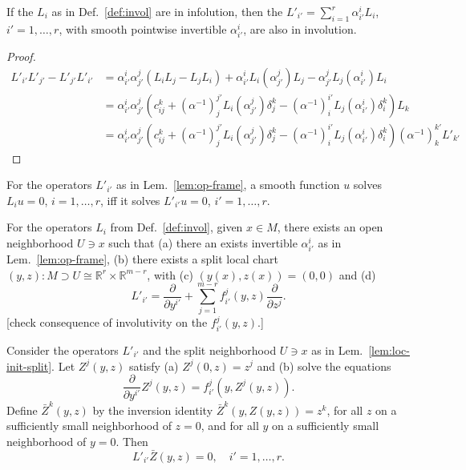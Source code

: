 \begin{lemma} \label{lem:op-frame}
If the $L_i$ as in Def.~\ref{def:invol} are in infolution, then the $L'_{i'} =
\sum_{i=1}^r \alpha_{i'}^i L_i$, $i'=1,\ldots,r$, with smooth pointwise invertible
$\alpha_{i'}^i$, are also in involution.
\end{lemma}
\begin{proof}
\begin{align*}
  L'_{i'} L'_{j'} - L'_{j'} L'_{i'}
  &= \alpha_{i'}^i \alpha_{j'}^j (L_i L_j - L_j L_i)
    + \alpha_{i'}^i L_i(\alpha_{j'}^j) L_j
    - \alpha_{j'}^j L_j(\alpha_{i'}^i) L_i
  \\
  &= \alpha_{i'}^i \alpha_{j'}^j \left(c_{ij}^k
    + (\alpha^{-1})_j^{j'} L_i(\alpha_{j'}^j) \delta_j^k
    - (\alpha^{-1})_i^{i'} L_j(\alpha_{i'}^i) \delta_i^k \right) L_k
  \\
  &= \alpha_{i'}^i \alpha_{j'}^j \left(c_{ij}^k
    + (\alpha^{-1})_j^{j'} L_i(\alpha_{j'}^j) \delta_j^k
    - (\alpha^{-1})_i^{i'} L_j(\alpha_{i'}^i) \delta_i^k \right) (\alpha^{-1})_k^{k'} L'_{k'}
\end{align*}
\end{proof}

\begin{lemma} \label{lem:eq-frame-equiv}
For the operators $L'_{i'}$ as in Lem.~\ref{lem:op-frame}, a smooth function $u$
solves $L_i u = 0$, $i=1,\ldots,r$, iff it solves $L'_{i'} u = 0$,
$i'=1,\ldots,r$.
\end{lemma}

\begin{lemma} \label{lem:loc-init-split}
For the operators $L_i$ from Def.~\ref{def:invol}, given $x \in M$, there exists
an open neighborhood $U\ni x$ such that (a) there an exists invertible
$\alpha_{i'}^i$ as in Lem.~\ref{lem:op-frame}, (b) there exists a split local
chart $(y,z)\colon M \supset U \cong \mathbb{R}^r \times \mathbb{R}^{m-r}$, with
(c) $(y(x),z(x)) = (0,0)$ and (d)
\[
  L'_{i'} = \frac{\partial}{\partial y^{i'}} + \sum_{j=1}^{m-r} f_{i'}^j(y,z) \frac{\partial}{\partial z^j} .
\]
[check consequence of involutivity on the $f_{i'}^j(y,z)$.] \notready
\end{lemma}

\begin{lemma} \label{lem:eq-loc-inv}
Consider the operators $L'_{i'}$ and the split neighborhood $U\ni x$ as in
Lem.~\ref{lem:loc-init-split}. Let $Z^j(y,z)$ satisfy (a) $Z^j(0,z) = z^j$ and
(b) solve the equations
\[
  \frac{\partial}{\partial y^{i'}} Z^j(y,z) = f_{i'}^j(y, Z^j(y,z)) .
\]
Define $\bar{Z}^k(y,z)$ by the inversion identity $\bar{Z}^k(y, Z(y, z)) = z^k$,
for all $z$ on a sufficiently small neighborhood of $z=0$, and for all $y$ on a
sufficiently small neighborhood of $y=0$. Then
\[
  L'_{i'} \bar{Z}(y,z) = 0, \quad i'=1,\ldots,r .
\]
\end{lemma}

